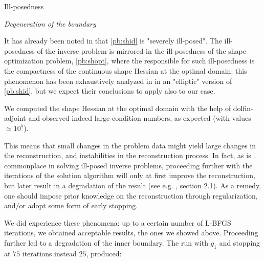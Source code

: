 \documentclass[english,a4paper,9pt,oneside]{scrbook}	%
\theoremstyle{break}
\theoremstyle{remark}
\begin{document}
\underline{Ill-posedness}

\textit{Degeneration of the boundary}

It has already been noted in \cite{harbrecht} that \cref{pb:shid} is "severely ill-posed". The ill-posedness of the inverse problem is mirrored in the ill-posedness of the shape optimization problem, \cref{pb:shopt}, where the responsible for such ill-posedness is the compactness of the continuous shape Hessian at the optimal domain: this phenomenon has been exhaustively analyzed in \cite{eppler} in an "elliptic" version of \cref{pb:shid}, but we expect their conclusions to apply also to our case.

We computed the shape Hessian at the optimal domain with the help of dolfin-adjoint and observed indeed large condition numbers, as expected (with values $\simeq 10^5$).

This means that small changes in the problem data might yield large changes in the reconstruction, and instabilities in the reconstruction process. In fact, as is commonplace in solving ill-posed inverse problems, proceeding further with the iterations of the solution algorithm will only at first improve the reconstruction, but later result in a degradation of the result (see e.g. \cite{kirsch}, section 2.1). As a remedy, one should impose prior knowledge on the reconstruction through regularization, and/or adopt some form of early stopping.

We did experience these phenomena: up to a certain number of L-BFGS iterations, we obtained acceptable results, the ones we showed above. Proceeding further led to a degradation of the inner boundary. The run with $g_1$ and stopping at $75$ iterations instead $25$, produced:
\end{document}
